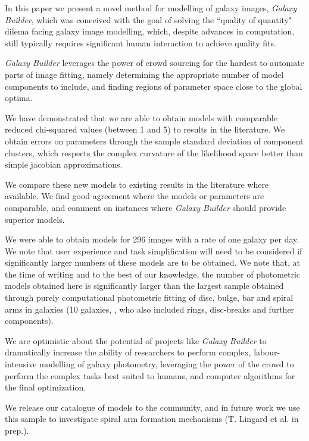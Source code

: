 \documentclass[../main.tex]{subfiles}
\begin{document}
\label{sec:conclusions}
In this paper we present a novel method for modelling of galaxy images, \textit{Galaxy Builder}, which was conceived with the goal of solving the ``quality of quantity" dilema facing galaxy image modelling, which, despite advances in computation, still typically requires significant human interaction to achieve quality fits.

\textit{Galaxy Builder} leverages the power of crowd sourcing for the hardest to automate parts of image fitting, namely determining the appropriate number of model components to include, and finding regions of parameter space close to the global optima.

We have demonstrated that we are able to obtain models with comparable reduced chi-squared values (between 1 and 5) to results in the literature. We obtain errors on parameters through the sample standard deviation of component clusters, which respects the complex curvature of the likelihood space better than simple jacobian approximations.

We compare these new models to existing results in the literature where available. We find good agreement where the models or parameters are comparable, and comment on instances where \textit{Galaxy Builder} should provide superior models.

We were able to obtain models for 296 images with a rate of one galaxy per day. We note that user experience and task simplification will need to be considered if significantly larger numbers of these models are to be obtained. We note that, at the time of writing and to the best of our knowledge, the number of photometric models obtained here is significantly larger than the largest sample obtained through purely computational photometric fitting of disc, bulge, bar and spiral arms in galaxies (10 galaxies, \citealt{Gao2017:1709.00746v1}, who also included rings, disc-breaks and further components).

We are optimistic about the potential of projects like \textit{Galaxy Builder} to dramatically increase the ability of researchers to perform complex, labour-intensive modelling of galaxy photometry, leveraging the power of the crowd to perform the complex tasks best suited to humans, and computer algorithms for the final optimization.

We release our catalogue of models to the community, and in future work we use this sample to investigate spiral arm formation mechanisms (T. Lingard et al. in prep.).
\end{document}
